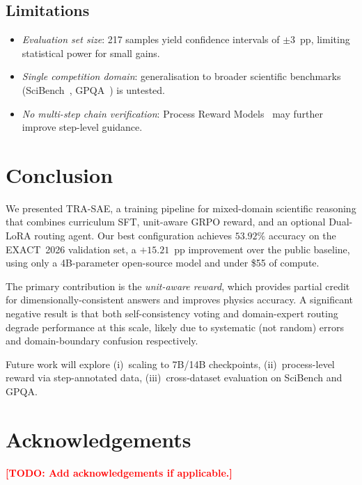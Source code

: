 \documentclass{ieeeaccess}
\newcommand{\todo}[1]{\textcolor{red}{\textbf{[TODO: #1]}}}
\newcommand{\modelname}{\textsc{TRA-SAE}}
\newcommand{\dataset}{EXACT~2026}
\begin{document}
\subsection{Limitations}

\begin{itemize}
  \item \emph{Evaluation set size}: 217 samples yield confidence intervals
        of $\pm 3$~pp, limiting statistical power for small gains.
  \item \emph{Single competition domain}: generalisation to broader
        scientific benchmarks (SciBench~\cite{Wang2024scibench},
        GPQA~\cite{Rein2023}) is untested.
  \item \emph{No multi-step chain verification}: Process Reward
        Models~\cite{Lightman2023} may further improve step-level guidance.
\end{itemize}

\section{Conclusion}
\label{sec:conclusion}

We presented \modelname{}, a training pipeline for mixed-domain scientific
reasoning that combines curriculum SFT, unit-aware GRPO reward, and an
optional Dual-LoRA routing agent.
Our best configuration achieves $53.92\%$ accuracy on the \dataset{}
validation set, a $+15.21$~pp improvement over the public baseline,
using only a 4B-parameter open-source model and under \$55 of compute.

The primary contribution is the \emph{unit-aware reward}, which provides
partial credit for dimensionally-consistent answers and improves physics
accuracy.
A significant negative result is that both self-consistency voting and
domain-expert routing degrade performance at this scale, likely due to
systematic (not random) errors and domain-boundary confusion respectively.

Future work will explore (i)~scaling to 7B/14B checkpoints,
(ii)~process-level reward via step-annotated data,
(iii)~cross-dataset evaluation on SciBench and GPQA.

\section*{Acknowledgements}
\todo{Add acknowledgements if applicable.}



\end{document}
